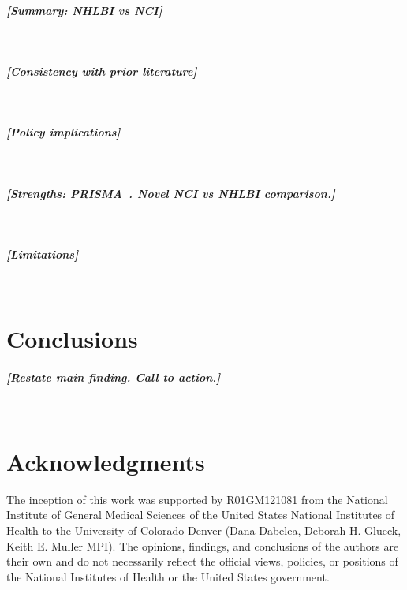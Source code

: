 \documentclass{article}
\newcommand{\outline}[1]{\paragraph{\textit{[#1]}}\mbox{}\\}
\begin{document}
\outline{Summary: NHLBI vs NCI}

\outline{Consistency with prior literature}

\outline{Policy implications}

\outline{Strengths: PRISMA~\cite{page_prisma_2021}. Novel NCI vs NHLBI comparison.}

\outline{Limitations}

\section{Conclusions}

\outline{Restate main finding. Call to action.}

\section*{Acknowledgments}
The inception of this work was supported by R01GM121081 from the National Institute of General Medical Sciences of the United States National Institutes of Health to the University of Colorado Denver (Dana Dabelea, Deborah H. Glueck, Keith E. Muller MPI). The opinions, findings, and conclusions of the authors are their own and do not necessarily reflect the official views, policies, or positions of the National Institutes of Health or the United States government.




\clearpage
\end{document}
